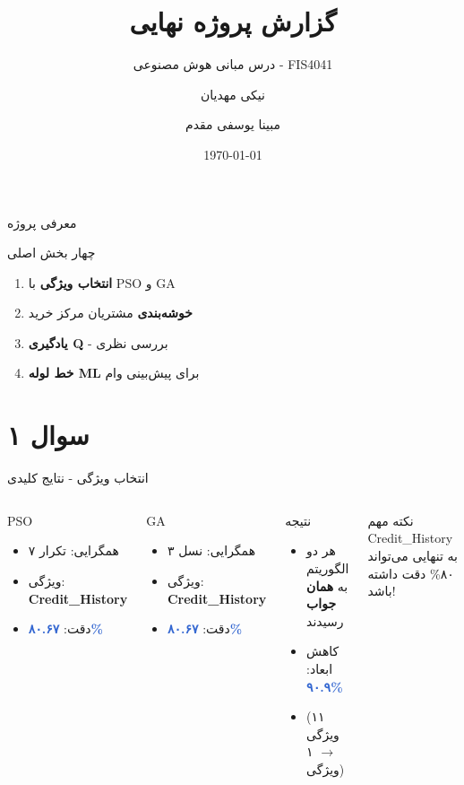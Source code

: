 \documentclass[aspectratio=169]{beamer}
\title{گزارش پروژه نهایی}
\subtitle{درس مبانی هوش مصنوعی - FIS4041}
\author{نیکی مهدیان \and مبینا یوسفی مقدم}
\date{\today}
\begin{document}
\begin{frame}
\titlepage
\end{frame}

\begin{frame}{معرفی پروژه}
\begin{block}{چهار بخش اصلی}
\begin{enumerate}
\item \textbf{انتخاب ویژگی} با PSO و GA
\item \textbf{خوشه‌بندی} مشتریان مرکز خرید
\item \textbf{یادگیری Q} - بررسی نظری
\item \textbf{خط لوله ML} برای پیش‌بینی وام
\end{enumerate}
\end{block}
\end{frame}

\section{سوال ۱}

\begin{frame}{انتخاب ویژگی - نتایج کلیدی}
\begin{columns}
\begin{block}{PSO}
\begin{itemize}
\item همگرایی: تکرار ۷
\item ویژگی: \textcolor{important}{\textbf{Credit\_History}}
\item دقت: \textcolor{highlight}{\textbf{۸۰.۶۷\%}}
\end{itemize}
\end{block}

\begin{block}{GA}
\begin{itemize}
\item همگرایی: نسل ۳
\item ویژگی: \textcolor{important}{\textbf{Credit\_History}}
\item دقت: \textcolor{highlight}{\textbf{۸۰.۶۷\%}}
\end{itemize}
\end{block}

\begin{block}{نتیجه}
\begin{itemize}
\item هر دو الگوریتم به \textbf{همان جواب} رسیدند
\item کاهش ابعاد: \textcolor{highlight}{\textbf{۹۰.۹\%}}
\item (۱۱ ویژگی $\rightarrow$ ۱ ویژگی)
\end{itemize}
\end{block}

\begin{alertblock}{نکته مهم}
Credit\_History به تنهایی می‌تواند ۸۰\% دقت داشته باشد!
\end{alertblock}
\end{columns}
\end{frame}
\end{document}
